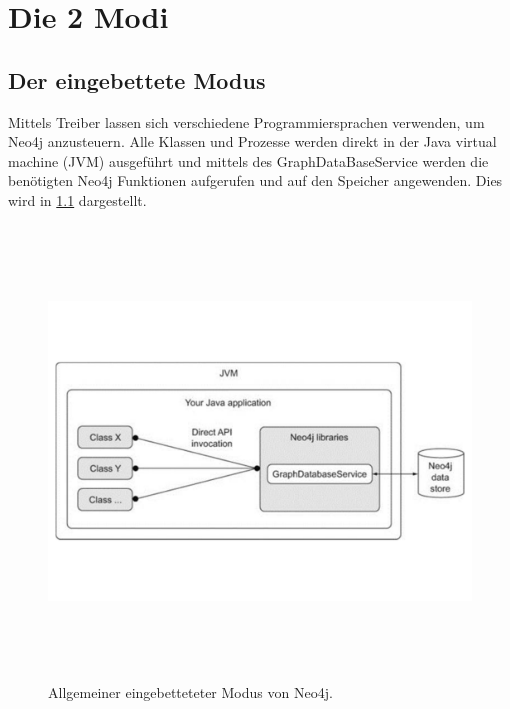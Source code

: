 
\chapter{Die 2 Modi} %

\label{ChapterX} %


\section{Der eingebettete Modus}

Mittels Treiber lassen sich verschiedene Programmiersprachen verwenden, um Neo4j anzusteuern. Alle Klassen und Prozesse werden direkt in der Java virtual machine (JVM) ausgeführt und mittels des GraphDataBaseService  werden die benötigten Neo4j Funktionen aufgerufen und auf den Speicher angewenden. Dies wird in \ref{fig:Embedded} dargestellt.
\begin{figure}[th]
	\centering
	\includegraphics [width=14cm, height=12cm]{Figures/Embedded}
	\caption[Architecture]{Allgemeiner eingebetteteter Modus von Neo4j.}
	\label{fig:Embedded}
\end{figure}


